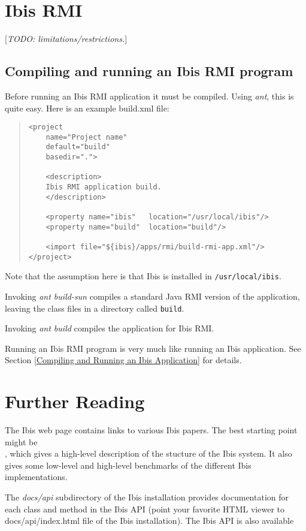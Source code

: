 \documentclass[10pt]{article}
\newcommand{\mysection}[1]{\section{#1}\label{#1}}
\newcommand{\mysubsection}[1]{\subsection{#1}\label{#1}}
\newcommand{\remark}[1]{[\emph{#1}]}
\begin{document}
\mysection{Ibis RMI}

\remark{TODO: limitations/restrictions.}

\mysubsection{Compiling and running an Ibis RMI program}

Before running an Ibis RMI application it must be compiled.
Using \emph{ant}, this is quite easy. Here is an example build.xml file:

\begin{quote}
\begin{verbatim}
<project
    name="Project name"
    default="build"
    basedir=".">

    <description>
    Ibis RMI application build.
    </description>

    <property name="ibis"   location="/usr/local/ibis"/>
    <property name="build"  location="build"/>

    <import file="${ibis}/apps/rmi/build-rmi-app.xml"/>
</project>
\end{verbatim}
\end{quote}
Note that the assumption here is that Ibis is installed in
\texttt{/usr/local/ibis}.

Invoking \emph{ant build-sun} compiles a standard Java RMI version of
the application, leaving the class files in a directory called \texttt{build}.

Invoking \emph{ant build} compiles the application for Ibis RMI.

Running an Ibis RMI program is very much like running an Ibis application.
See Section \ref{Compiling and Running an Ibis Application} for details.

\mysection{Further Reading}

The Ibis web page
{}
{}
contains links to various Ibis papers.
The best starting point might be \\
{}
{}, which gives a high-level description of the stucture of the Ibis system.
It also gives some low-level and high-level benchmarks of the different Ibis implementations.

The \emph{docs/api} subdirectory of the Ibis installation provides
documentation for each class and method in the Ibis API (point your favorite
HTML viewer to docs/api/index.html file of the Ibis installation).
The Ibis API is also available
\end{document}
